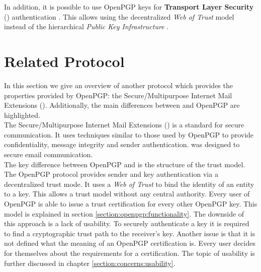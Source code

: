 
In addition, it is possible to use OpenPGP keys for \textbf{Transport Layer Security} () authentication \cite{RFC6091}. This allows using the decentralized \textit{Web of Trust} model instead of the hierarchical \textit{Public Key Infrastructure}  \citep{RFC5280}. 

\section{Related Protocol} \label{section:openpgp:smime}

In this section we give an overview of another protocol which provides the properties provided by OpenPGP: the Secure/Multipurpose Internet Mail Extensions (). Additionally, the main differences between  and OpenPGP are highlighted. \\

The Secure/Multipurpose Internet Mail Extensions () \citep{RFC5751} is a standard for secure communication. It uses techniques similar to those used by OpenPGP to provide confidentiality, message integrity and sender authentication.  was designed to secure email communication.  \\

The key difference between OpenPGP and  is the structure of the trust model.  \\

The {OpenPGP} protocol provides sender and key authentication via a decentralized trust mode. It uses a \textit{Web of Trust} to bind the identity of an entity to a key. This allows a trust model without any central authority. Every user of OpenPGP is able to issue a trust certification for every other OpenPGP key. This model is explained in section \ref{section:openpgp:functionality}. The downside of this approach is a lack of usability. To securely authenticate a key it is required to find a cryptographic trust path to the receiver's key. Another issue is that it is not defined what the meaning of an OpenPGP certification is. Every user decides for themselves about the requirements for a certification. The topic of usability is further discussed in chapter \ref{section:concerns:usability}. \\

